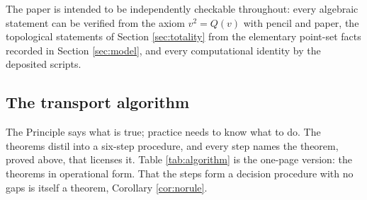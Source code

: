 The paper is intended to be independently checkable throughout: every algebraic statement can be verified from the axiom $v^2 = Q(v)$ with pencil and paper, the topological statements of Section \ref{sec:totality} from the elementary point-set facts recorded in Section \ref{sec:model}, and every computational identity by the deposited scripts.

\subsection{The transport algorithm}\label{sec:algorithm}

The Principle says what is true; practice needs to know what to do. The theorems distil into a six-step procedure, and every step names the theorem, proved above, that licenses it. Table \ref{tab:algorithm} is the one-page version: the theorems in operational form. That the steps form a decision procedure with no gaps is itself a theorem, Corollary \ref{cor:norule}.




